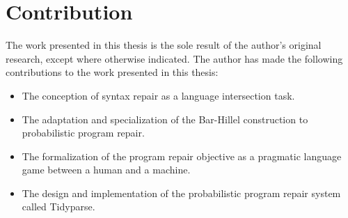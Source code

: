 \chapter*{\rm\bfseries Contribution}
\label{ch:contribution}

%

The work presented in this thesis is the sole result of the author's original research, except where otherwise indicated. The author has made the following contributions to the work presented in this thesis:

\begin{itemize}
    \item The conception of syntax repair as a language intersection task.
    \item The adaptation and specialization of the Bar-Hillel construction to probabilistic program repair.
    \item The formalization of the program repair objective as a pragmatic language game between a human and a machine.
    \item The design and implementation of the probabilistic program repair system called Tidyparse.
\end{itemize}
 